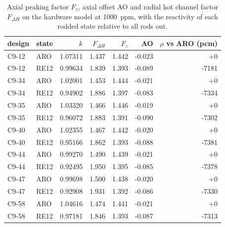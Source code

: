 \begin{table}[htbp]
  \centering
  \caption{Axial peaking factor $F_z$, axial offset AO and radial hot channel factor $F_{\Delta H}$ on the hardware model at \SI{1000}{ppm}, with the reactivity of each rodded state relative to all rods out.}
  \label{tab:c9-axial}
  \begin{tabular}{llrrrrr}
    \toprule
    design & state & $k$ & $F_{\Delta H}$ & $F_z$ & AO & $\rho$ vs ARO (pcm) \\
    \midrule
    C9-12 & ARO & 1.07311 & 1.437 & 1.442 & -0.023 & +0 \\
    C9-12 & RE12 & 0.99634 & 1.839 & 1.393 & -0.089 & -7181 \\
    C9-34 & ARO & 1.02001 & 1.453 & 1.444 & -0.021 & +0 \\
    C9-34 & RE12 & 0.94902 & 1.886 & 1.397 & -0.083 & -7334 \\
    C9-35 & ARO & 1.03320 & 1.466 & 1.446 & -0.019 & +0 \\
    C9-35 & RE12 & 0.96072 & 1.883 & 1.391 & -0.090 & -7302 \\
    C9-40 & ARO & 1.02355 & 1.467 & 1.442 & -0.020 & +0 \\
    C9-40 & RE12 & 0.95166 & 1.862 & 1.393 & -0.088 & -7381 \\
    C9-44 & ARO & 0.99270 & 1.490 & 1.439 & -0.021 & +0 \\
    C9-44 & RE12 & 0.92495 & 1.950 & 1.395 & -0.085 & -7378 \\
    C9-47 & ARO & 0.99698 & 1.500 & 1.438 & -0.020 & +0 \\
    C9-47 & RE12 & 0.92908 & 1.931 & 1.392 & -0.086 & -7330 \\
    C9-58 & ARO & 1.04616 & 1.474 & 1.441 & -0.021 & +0 \\
    C9-58 & RE12 & 0.97181 & 1.846 & 1.393 & -0.087 & -7313 \\
    \bottomrule
  \end{tabular}
\end{table}
